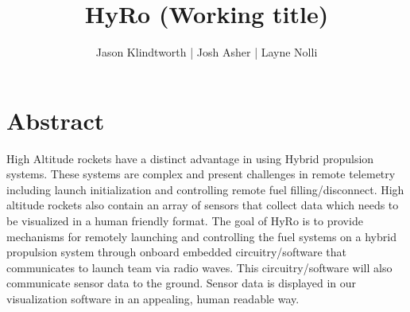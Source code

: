 \documentclass[12pt]{report}
\begin{document}
\title{HyRo (Working title)}
\author{Jason Klindtworth  |  Josh Asher  |   Layne Nolli}
\maketitle

\newpage

\sectionfont{\scshape}
\section{Abstract}
High Altitude rockets have a distinct advantage in using Hybrid propulsion systems. These systems are complex and present challenges in remote telemetry including launch initialization and controlling remote fuel filling/disconnect. High altitude rockets also contain an array of sensors that collect data which needs to be visualized in a human friendly format. The goal of HyRo is to provide mechanisms for remotely launching and controlling the fuel systems on a hybrid propulsion system through onboard embedded circuitry/software that communicates to launch team via radio waves. This circuitry/software will also communicate sensor data to the ground. Sensor data is displayed in our visualization software in an appealing, human readable way. 
\end{document}
